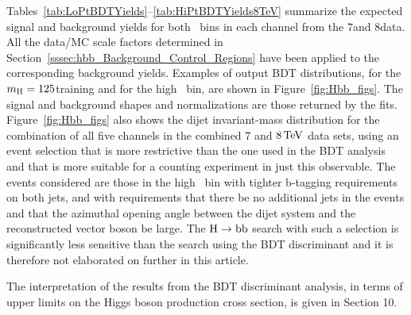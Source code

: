 \documentclass[12pt,twoside,a4paper,cmspaper,final,collab]{cms-tdr}
\begin{document}
Tables~\ref{tab:LoPtBDTYields}--\ref{tab:HiPtBDTYields8TeV} summarize the expected
signal and background yields for both \ptV\ bins in each channel from the 7\TeV and 8\TeV data.
All the data/MC scale factors determined in
Section~\ref{sssec:hbb_Background_Control_Regions} have been applied to the corresponding
background yields. Examples of output BDT distributions, for the $m_{\mathrm{H}}=125$\GeV training and
for the high \ptV\ bin, are shown in Figure~\ref{fig:Hbb_figs}. The
signal and background shapes and normalizations are those returned by
the fits. Figure~\ref{fig:Hbb_figs} also shows the
dijet invariant-mass distribution for the combination of all five channels in the
combined $7$ and $8\,\text{Te\hspace{-.08em}V}$ data sets, using an event selection that is more
restrictive than the one used in the BDT analysis and that is more
suitable for a counting experiment in just this observable. The events considered
are those in the high \ptV\ bin with tighter b-tagging requirements on
both jets, and with requirements that there be no additional jets in
the events and that the azimuthal opening angle between the
dijet system and the reconstructed vector boson be large. The
$\mathrm{H}\to\mathrm{b}\mathrm{b}$ search
with such a selection is significantly less sensitive
than the search using the BDT discriminant and it is therefore not
elaborated on further in this article.


The interpretation of the results from the BDT discriminant analysis, in terms of upper limits on the
Higgs boson production cross section, is given in Section 10.
\end{document}
